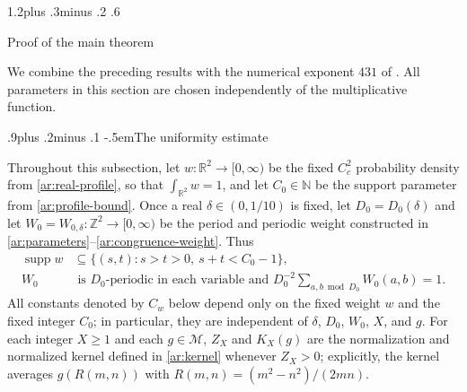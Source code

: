 \documentclass[twoside]{aomart}
\makeatletter
\theoremstyle{paperplain}
\theoremstyle{paperdefinition}
\renewcommand\section{\@startsection{section}{1}{\z@}
  {1.2\baselineskip plus .3\baselineskip minus .2\baselineskip}
  {.6\baselineskip}{\normalfont\large\bfseries\raggedright}}
\renewcommand\subsection{\@startsection{subsection}{2}{\z@}
  {.9\baselineskip plus .2\baselineskip minus .1\baselineskip}
  {-.5em}{\normalfont\bfseries}}
\numberwithin{equation}{section}
\makeatother
\begin{document}
\section{Proof of the main theorem}
\label{main:section}

We combine the preceding results with the numerical exponent $431$
of . All parameters in this section
are chosen independently of the multiplicative function.

\subsection{The uniformity estimate}

Throughout this subsection, let
$w:\mathbb R^2\to[0,\infty)$ be the fixed $C_c^2$ probability density
from \eqref{ar:real-profile}, so that $\displaystyle \int_{\mathbb R^2}w=1$, and let
$C_0\in\mathbb N$ be the support parameter from
\eqref{ar:profile-bound}.  Once a real $\delta\in(0,1/10)$ is fixed, let
$D_0=D_0(\delta)$ and let
$W_0=W_{0,\delta}:\mathbb Z^2\to[0,\infty)$ be the period and periodic
weight constructed in
\eqref{ar:parameters}--\eqref{ar:congruence-weight}.  Thus
\[
 \begin{aligned}
 \operatorname{supp}w&\subseteq\{(s,t):s>t>0,\ s+t<C_0-1\},\\
 W_0&\text{ is $D_0$-periodic in each variable and }
 D_0^{-2}\sum_{a,b\bmod D_0}W_0(a,b)=1.
 \end{aligned}
\]
All constants denoted by $C_w$ below depend only on the fixed weight $w$
and the fixed integer $C_0$; in particular, they are independent of
$\delta$, $D_0$, $W_0$, $X$, and $g$.
For each integer $X\ge1$ and each $g\in\mathcal M$, $Z_X$ and $K_X(g)$
are the normalization and normalized kernel defined in \eqref{ar:kernel}
whenever $Z_X>0$; explicitly, the kernel averages $g(R(m,n))$ with
$R(m,n)=(m^2-n^2)/(2mn)$.
\end{document}
